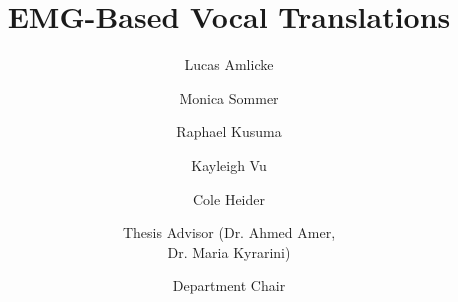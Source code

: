 \documentclass{scu-thesis}
\author{Lucas Amlicke}
\author{Monica Sommer}
\author{Raphael Kusuma}
\author{Kayleigh Vu}
\author{Cole Heider}
\title{EMG-Based Vocal Translations}
\begin{document}
\frontmatter
\signature{Thesis Advisor (Dr. Ahmed Amer,\\ Dr. Maria Kyrarini)}


\signature{Department Chair}



\tableofcontents
\listoffigures

\mainmatter













\backmatter
\end{document}
